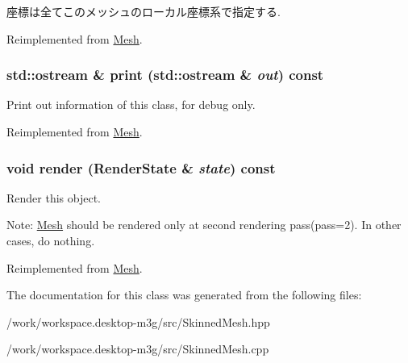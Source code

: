 座標は全てこのメッシュのローカル座標系で指定する. 

Reimplemented from \hyperlink{classm3g_1_1Mesh_dc812d8230f94f0b6b8e4fecdb802a16}{Mesh}.\hypertarget{classm3g_1_1SkinnedMesh_6fea17fa1532df3794f8cb39cb4f911f}{
\subsubsection[{print}]{\setlength{\rightskip}{0pt plus 5cm}std::ostream \& print (std::ostream \& {\em out}) const}}
\label{classm3g_1_1SkinnedMesh_6fea17fa1532df3794f8cb39cb4f911f}


Print out information of this class, for debug only. 

Reimplemented from \hyperlink{classm3g_1_1Mesh_6fea17fa1532df3794f8cb39cb4f911f}{Mesh}.\hypertarget{classm3g_1_1SkinnedMesh_8babc8a79b78615da51161e94029eea9}{
\subsubsection[{render}]{\setlength{\rightskip}{0pt plus 5cm}void render ({\bf RenderState} \& {\em state}) const}}
\label{classm3g_1_1SkinnedMesh_8babc8a79b78615da51161e94029eea9}


Render this object.

Note: \hyperlink{classm3g_1_1Mesh}{Mesh} should be rendered only at second rendering pass(pass=2). In other cases, do nothing. 

Reimplemented from \hyperlink{classm3g_1_1Mesh_8babc8a79b78615da51161e94029eea9}{Mesh}.

The documentation for this class was generated from the following files:\begin{CompactItemize}
\item 
/work/workspace.desktop-m3g/src/SkinnedMesh.hpp\item 
/work/workspace.desktop-m3g/src/SkinnedMesh.cpp\end{CompactItemize}
